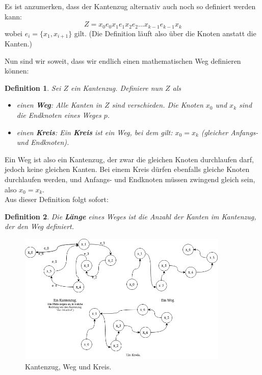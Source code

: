 \documentclass{article}
\newtheorem{definition}{Definition}
\theoremstyle{plain}
\begin{document}
\begin{small}
	\begin{emph}
		Es ist anzumerken, dass der Kantenzug alternativ auch noch so definiert werden kann:\\
		\begin{equation*}
			Z = x_0e_0x_1e_1x_2e_2 \ldots x_{k-1}e_{k-1}x_k
		\end{equation*}
		wobei $e_i = \{x_1, x_{i+1}\}$ gilt. (Die Definition läuft also über die Knoten anstatt die Kanten.)
	\end{emph}
\end{small}
\bigskip
Nun sind wir soweit, dass wir endlich einen mathematischen Weg definieren können:\\
\begin{definition}
	Sei $Z$ ein Kantenzug. Definiere nun $Z$ als
	\begin{itemize}
		\item einen \textbf{Weg}: Alle Kanten in $Z$ sind verschieden. Die Knoten $x_0$ und $x_k$ sind die \emph{Endknoten} eines Weges $p$.
		\item einen \textbf{Kreis}: Ein \textbf{Kreis} ist ein Weg, bei dem gilt: $x_0 = x_k$ (gleicher Anfangs- und Endknoten).\cite[S.~9]{bue_1}
	\end{itemize}
\end{definition}
\bigskip
Ein Weg ist also ein Kantenzug, der zwar die gleichen Knoten durchlaufen darf, jedoch keine gleichen Kanten. Bei einem Kreis dürfen ebenfalls gleiche Knoten durchlaufen werden, und Anfangs- und Endknoten müssen zwingend gleich sein, also $x_0 = x_k$.\\
\bigskip
Aus dieser Definition folgt sofort:
\begin{definition}
	Die \textbf{Länge} eines Weges ist die Anzahl der Kanten im Kantenzug, der den Weg definiert.
\end{definition}
\bigskip
\vfill
\begin{figure}[!htp]
    \centering
    \includegraphics[width=10cm]{vortrag_schriftlich/images/kantenzug_weg.drawio.png}
    \caption{Kantenzug, Weg und Kreis.}
    \label{fig:fig7}
\end{figure}
\end{document}
